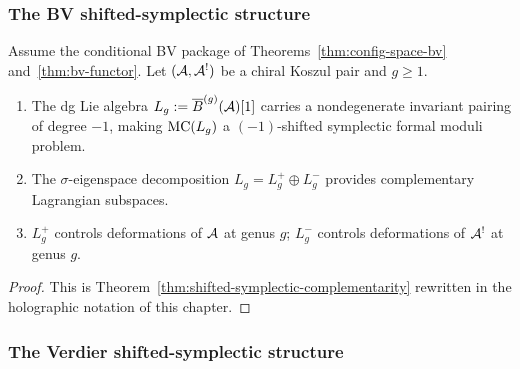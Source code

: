 \subsubsection{The BV shifted-symplectic structure}
\label{subsubsec:thqg-III-bv-shifted}

\begin{theorem}
\label{thm:thqg-III-bv-lagrangian}
Assume the conditional BV package of
Theorems~\ref{thm:config-space-bv} and~\ref{thm:bv-functor}.
Let $(\mathcal{A}, \mathcal{A}^!)$ be a chiral Koszul pair and $g \ge 1$.
\begin{enumerate}[label=\textup{(\roman*)}]
\item The dg Lie algebra
 $L_g := \overline{B}^{(g)}(\mathcal{A})[1]$ carries a nondegenerate
 invariant pairing of degree $-1$, making $\mathrm{MC}(L_g)$
 a $(-1)$-shifted symplectic formal moduli problem.

\item The $\sigma$-eigenspace decomposition
 $L_g = L_g^+ \oplus L_g^-$ provides complementary
 Lagrangian subspaces.

\item $L_g^+$ controls deformations of $\mathcal{A}$ at genus $g$;
 $L_g^-$ controls deformations of $\mathcal{A}^!$ at genus $g$.
\end{enumerate}
\end{theorem}

\begin{proof}
This is Theorem~\ref{thm:shifted-symplectic-complementarity} rewritten
in the holographic notation of this chapter.
\end{proof}

\subsubsection{The Verdier shifted-symplectic structure}
\label{subsubsec:thqg-III-verdier-shifted}

